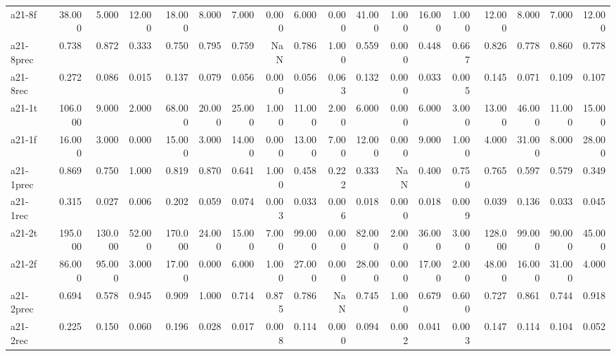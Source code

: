 \begin{tabular}{lrrrrrrrrrrrrrrrrr}
a21-8f     &   38.000 &       5.000 &      12.000 &   18.000 &    8.000 &    7.000 &   0.000 &       6.000 &   0.000 &  41.000 &   1.000 &      16.000 &    1.000 &   12.000 &    8.000 &      7.000 &          12.000 \\
a21-8prec  &    0.738 &       0.872 &       0.333 &    0.750 &    0.795 &    0.759 &     NaN &       0.786 &   1.000 &   0.559 &   0.000 &       0.448 &    0.667 &    0.826 &    0.778 &      0.860 &           0.778 \\
a21-8rec   &    0.272 &       0.086 &       0.015 &    0.137 &    0.079 &    0.056 &   0.000 &       0.056 &   0.063 &   0.132 &   0.000 &       0.033 &    0.005 &    0.145 &    0.071 &      0.109 &           0.107 \\
a21-1t     &  106.000 &       9.000 &       2.000 &   68.000 &   20.000 &   25.000 &   1.000 &      11.000 &   2.000 &   6.000 &   0.000 &       6.000 &    3.000 &   13.000 &   46.000 &     11.000 &          15.000 \\
a21-1f     &   16.000 &       3.000 &       0.000 &   15.000 &    3.000 &   14.000 &   0.000 &      13.000 &   7.000 &  12.000 &   0.000 &       9.000 &    1.000 &    4.000 &   31.000 &      8.000 &          28.000 \\
a21-1prec  &    0.869 &       0.750 &       1.000 &    0.819 &    0.870 &    0.641 &   1.000 &       0.458 &   0.222 &   0.333 &     NaN &       0.400 &    0.750 &    0.765 &    0.597 &      0.579 &           0.349 \\
a21-1rec   &    0.315 &       0.027 &       0.006 &    0.202 &    0.059 &    0.074 &   0.003 &       0.033 &   0.006 &   0.018 &   0.000 &       0.018 &    0.009 &    0.039 &    0.136 &      0.033 &           0.045 \\
a21-2t     &  195.000 &     130.000 &      52.000 &  170.000 &   24.000 &   15.000 &   7.000 &      99.000 &   0.000 &  82.000 &   2.000 &      36.000 &    3.000 &  128.000 &   99.000 &     90.000 &          45.000 \\
a21-2f     &   86.000 &      95.000 &       3.000 &   17.000 &    0.000 &    6.000 &   1.000 &      27.000 &   0.000 &  28.000 &   0.000 &      17.000 &    2.000 &   48.000 &   16.000 &     31.000 &           4.000 \\
a21-2prec  &    0.694 &       0.578 &       0.945 &    0.909 &    1.000 &    0.714 &   0.875 &       0.786 &     NaN &   0.745 &   1.000 &       0.679 &    0.600 &    0.727 &    0.861 &      0.744 &           0.918 \\
a21-2rec   &    0.225 &       0.150 &       0.060 &    0.196 &    0.028 &    0.017 &   0.008 &       0.114 &   0.000 &   0.094 &   0.002 &       0.041 &    0.003 &    0.147 &    0.114 &      0.104 &           0.052 \\

\end{tabular}
